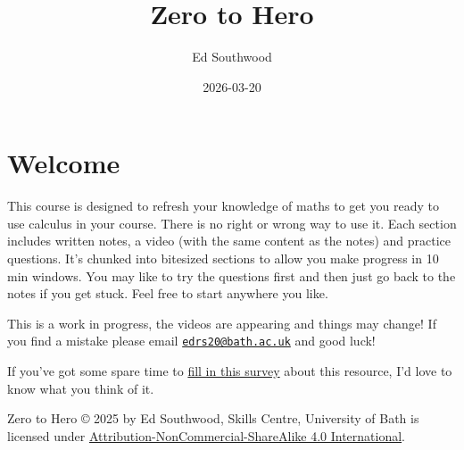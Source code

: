 \documentclass[
  a4paper,
]{scrbook}
\title{Zero to Hero}
\author{Ed Southwood}
\date{2026-03-20}
\renewcommand*\contentsname{Table of contents}
\newcommand\contentsname{Table of contents}
\begin{document}
\frontmatter
\maketitle

\renewcommand*\contentsname{Table of contents}
{
\setcounter{tocdepth}{2}
\tableofcontents
}

\mainmatter
{}

\chapter*{Welcome}\label{welcome}


This course is designed to refresh your knowledge of maths to get you
ready to use calculus in your course. There is no right or wrong way to
use it. Each section includes written notes, a video (with the same
content as the notes) and practice questions. It's chunked into
bitesized sections to allow you make progress in 10 min windows. You may
like to try the questions first and then just go back to the notes if
you get stuck. Feel free to start anywhere you like.

This is a work in progress, the videos are appearing and things may
change! If you find a mistake please email
\href{mailto:edrs20@bath.ac.uk}{\nolinkurl{edrs20@bath.ac.uk}} and good
luck!

\begin{tcolorbox}[enhanced jigsaw, arc=.35mm, bottomrule=.15mm, bottomtitle=1mm, breakable, colback=white, colbacktitle=quarto-callout-tip-color!10!white, colframe=quarto-callout-tip-color-frame, coltitle=black, left=2mm, leftrule=.75mm, opacityback=0, opacitybacktitle=0.6, rightrule=.15mm, title=\textcolor{quarto-callout-tip-color}{\faLightbulb}\hspace{0.5em}{Let me know what you think}, titlerule=0mm, toprule=.15mm, toptitle=1mm]

If you've got some spare time to
\href{https://bathreg.onlinesurveys.ac.uk/zero-to-hero}{fill in this
survey} about this resource, I'd love to know what you think of it.

\end{tcolorbox}

Zero to Hero © 2025 by Ed Southwood, Skills Centre, University of Bath
is licensed under
\href{https://creativecommons.org/licenses/by-nc-sa/4.0/}{Attribution-NonCommercial-ShareAlike
4.0 International}.
\end{document}

